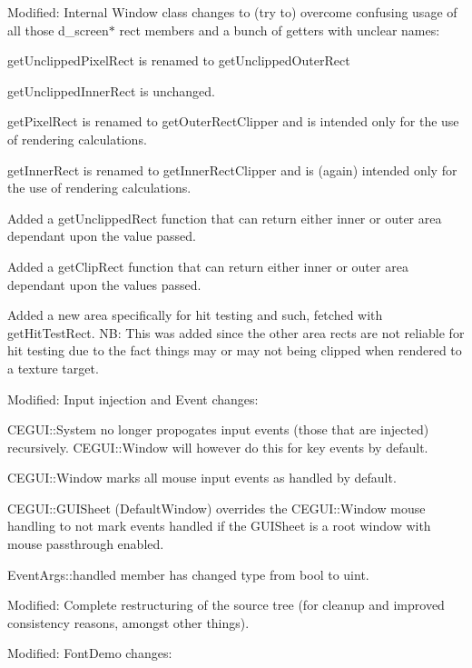 \begin{DoxyItemize}
\item Modified\+: Internal Window class changes to (try to) overcome confusing usage of all those d\+\_\+screen$\ast$ rect members and a bunch of getters with unclear names\+:
\begin{DoxyItemize}
\item get\+Unclipped\+Pixel\+Rect is renamed to get\+Unclipped\+Outer\+Rect
\item get\+Unclipped\+Inner\+Rect is unchanged.
\item get\+Pixel\+Rect is renamed to get\+Outer\+Rect\+Clipper and is intended only for the use of rendering calculations.
\item get\+Inner\+Rect is renamed to get\+Inner\+Rect\+Clipper and is (again) intended only for the use of rendering calculations.
\item Added a get\+Unclipped\+Rect function that can return either inner or outer area dependant upon the value passed.
\item Added a get\+Clip\+Rect function that can return either inner or outer area dependant upon the values passed.
\item Added a new area specifically for hit testing and such, fetched with get\+Hit\+Test\+Rect. NB\+: This was added since the other area rects are not reliable for hit testing due to the fact things may or may not being clipped when rendered to a texture target.
\end{DoxyItemize}
\item Modified\+: Input injection and Event changes\+:
\begin{DoxyItemize}
\item C\+E\+G\+U\+I\+::\+System no longer propogates input events (those that are injected) recursively. C\+E\+G\+U\+I\+::\+Window will however do this for key events by default.
\item C\+E\+G\+U\+I\+::\+Window marks all mouse input events as handled by default.
\item C\+E\+G\+U\+I\+::\+G\+U\+I\+Sheet (Default\+Window) overrides the C\+E\+G\+U\+I\+::\+Window mouse handling to not mark events handled if the G\+U\+I\+Sheet is a root window with mouse passthrough enabled.
\item Event\+Args\+::handled member has changed type from bool to uint.
\end{DoxyItemize}
\item Modified\+: Complete restructuring of the source tree (for cleanup and improved consistency reasons, amongst other things).
\item Modified\+: Font\+Demo changes\+:

\end{DoxyItemize}
